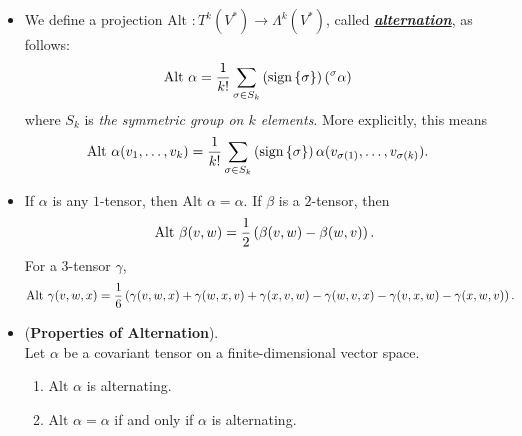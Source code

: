 \documentclass[11pt]{article}
\begin{document}
\begin{itemize}
\item \begin{definition}
We define a projection $\text{Alt }: T^k(V^{*}) \rightarrow \Lambda^k(V^{*})$, called \underline{\emph{\textbf{alternation}}}, as follows:
\begin{align*}
\text{Alt }\alpha &=\frac{1}{k!} \sum_{\sigma \in S_k} \left(\text{sign}\left\{\sigma\right\}\right)\left(^{\sigma}\alpha\right)
\end{align*} where $S_k$ is \emph{the symmetric group on $k$ elements}. More explicitly, this means
\begin{align*}
\text{Alt }\alpha(v_1, \ldots, v_k) &= \frac{1}{k!} \sum_{\sigma \in S_k} \left(\text{sign}\left\{\sigma\right\}\right)\alpha(v_{\sigma(1)}, \ldots, v_{\sigma(k)}).
\end{align*}
\end{definition}

\item \begin{example}
If $\alpha$ is any $1$-tensor, then $\text{Alt }\alpha = \alpha$. If $\beta$ is a $2$-tensor, then
\begin{align*}
\text{Alt }\beta(v, w) = \frac{1}{2}\left(\beta(v, w) - \beta(w, v)\right).
\end{align*}
For a $3$-tensor $\gamma$,
\begin{align*}
\text{Alt }\gamma(v, w, x) &= \frac{1}{6}\left(\gamma(v, w, x) + \gamma(w, x, v) + \gamma(x, v, w) - \gamma(w, v, x) - \gamma(v, x, w) - \gamma(x, w, v)\right).
\end{align*} 
\end{example}

\item \begin{proposition}(\textbf{Properties of Alternation}). \\
Let $\alpha$ be a covariant tensor on a finite-dimensional vector space.
\begin{enumerate}
\item $\text{Alt }\alpha$ is alternating.
\item $\text{Alt }\alpha = \alpha$ if and only if $\alpha$ is alternating.
\end{enumerate}
\end{proposition}
\end{itemize}
\end{document}
